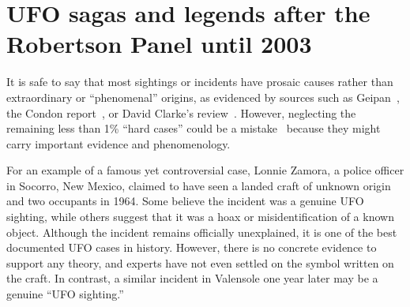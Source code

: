 %
%
%
\chapter{UFO sagas and legends after the Robertson Panel until 2003}
\label{2023-UFO-part-History-chapter-1953-2003} %








It is safe to say that most sightings or incidents have prosaic causes rather than extraordinary or ``phenomenal'' origins,
as evidenced by sources such as Geipan~\cite{Geipan}, the Condon report~\cite{Condon-report-Bantam}, or David Clarke's review~\cite{Clarke2013Apr}.
However, neglecting the remaining less than 1{\%}
``hard cases'' could be a mistake~\cite{AA-Condon-1970} because they might carry important evidence and phenomenology.

For an example of a famous yet controversial case, Lonnie Zamora, a police officer in Socorro, New Mexico, claimed to have seen a landed craft of unknown origin and two occupants in 1964.
 Some believe the incident was a genuine UFO sighting, while others suggest that it was a hoax or misidentification of a known object.
Although the incident remains officially unexplained, it is one of the best documented UFO cases in history.
However, there is no concrete evidence to support any theory, and experts have not even settled on the symbol written on the craft. In contrast, a similar incident in Valensole one year later may be a genuine ``UFO sighting.''

